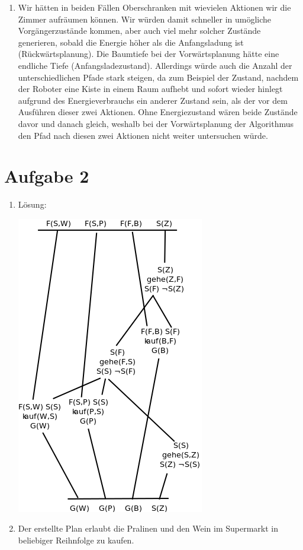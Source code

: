 \documentclass[a4paper,10pt]{article}
\begin{document}
\begin{enumerate}[~~a.)]
    \item Wir hätten in beiden Fällen Oberschranken mit wievielen Aktionen wir die Zimmer aufräumen können. Wir würden damit schneller in umögliche Vorgängerzustände kommen, aber auch viel mehr solcher Zustände generieren, sobald die Energie höher als die Anfangsladung ist (Rückwärtsplanung). Die Baumtiefe bei der Vorwärtsplanung hätte eine endliche Tiefe (Anfangsladezustand). Allerdings würde auch die Anzahl der unterschiedlichen Pfade stark steigen, da zum Beispiel der Zustand, nachdem der Roboter eine Kiste in einem Raum aufhebt und sofort wieder hinlegt aufgrund des Energieverbrauchs ein anderer Zustand sein, als der vor dem Ausführen dieser zwei Aktionen. Ohne Energiezustand wären beide Zustände davor und danach gleich, weshalb bei der Vorwärtsplanung der Algorithmus den Pfad nach diesen zwei Aktionen nicht weiter untersuchen würde.
\end{enumerate}
\newpage
\section*{Aufgabe 2}
\begin{enumerate}[~~a)]
    \item Lösung:\\
    \begin{center} \includegraphics{planning.png} \\ \end{center}
    \item Der erstellte Plan erlaubt die Pralinen und den Wein im Supermarkt in beliebiger Reihnfolge zu kaufen.
\end{enumerate}
\end{document}
